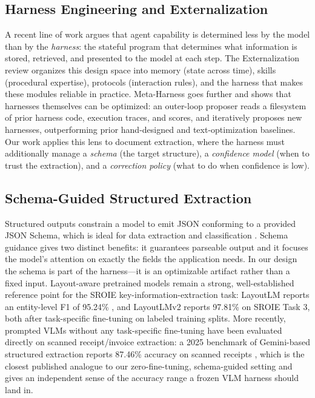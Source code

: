 \documentclass[conference]{IEEEtran}
\begin{document}
\subsection{Harness Engineering and Externalization}
A recent line of work argues that agent capability is determined less by the model than by the \emph{harness}: the stateful program that determines what information is stored, retrieved, and presented to the model at each step. The Externalization review \cite{b1} organizes this design space into memory (state across time), skills (procedural expertise), protocols (interaction rules), and the harness that makes these modules reliable in practice. Meta-Harness \cite{b2} goes further and shows that harnesses themselves can be optimized: an outer-loop proposer reads a filesystem of prior harness code, execution traces, and scores, and iteratively proposes new harnesses, outperforming prior hand-designed and text-optimization baselines. Our work applies this lens to document extraction, where the harness must additionally manage a \emph{schema} (the target structure), a \emph{confidence model} (when to trust the extraction), and a \emph{correction policy} (what to do when confidence is low).

\subsection{Schema-Guided Structured Extraction}
Structured outputs constrain a model to emit JSON conforming to a provided JSON Schema, which is ideal for data extraction and classification \cite{b4}. Schema guidance gives two distinct benefits: it guarantees parseable output and it focuses the model's attention on exactly the fields the application needs. In our design the schema is part of the harness---it is an optimizable artifact rather than a fixed input. Layout-aware pretrained models remain a strong, well-established reference point for the SROIE key-information-extraction task: LayoutLM reports an entity-level F1 of 95.24\% \cite{b8}, and LayoutLMv2 reports 97.81\% \cite{b9} on SROIE Task 3, both after task-specific fine-tuning on labeled training splits. More recently, prompted VLMs without any task-specific fine-tuning have been evaluated directly on scanned receipt/invoice extraction: a 2025 benchmark of Gemini-based structured extraction reports 87.46\% accuracy on scanned receipts \cite{b10}, which is the closest published analogue to our zero-fine-tuning, schema-guided setting and gives an independent sense of the accuracy range a frozen VLM harness should land in.
\end{document}
